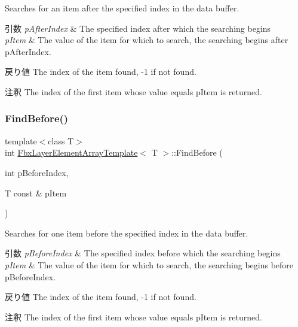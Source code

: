 Searches for an item after the specified index in the data buffer. 
\begin{DoxyParams}{引数}
{\em p\+After\+Index} & The specified index after which the searching begins \\
\hline
{\em p\+Item} & The value of the item for which to search, the searching begins after p\+After\+Index. \\
\hline
\end{DoxyParams}
\begin{DoxyReturn}{戻り値}
The index of the item found, -\/1 if not found. 
\end{DoxyReturn}
\begin{DoxyRemark}{注釈}
The index of the first item whose value equals p\+Item is returned. 
\end{DoxyRemark}
\mbox{\label{class_fbx_layer_element_array_template_a27a66a52ff1642fd6a5ed7c34d72c3c7}} 
\subsubsection{\texorpdfstring{Find\+Before()}{FindBefore()}}
{\footnotesize\ttfamily template$<$class T$>$ \\
int \hyperlink{class_fbx_layer_element_array_template}{Fbx\+Layer\+Element\+Array\+Template}$<$ T $>$\+::Find\+Before (\begin{DoxyParamCaption}\item[{int}]{p\+Before\+Index,  }\item[{T const \&}]{p\+Item }\end{DoxyParamCaption})}

Searches for one item before the specified index in the data buffer. 
\begin{DoxyParams}{引数}
{\em p\+Before\+Index} & The specified index before which the searching begins \\
\hline
{\em p\+Item} & The value of the item for which to search, the searching begins before p\+Before\+Index. \\
\hline
\end{DoxyParams}
\begin{DoxyReturn}{戻り値}
The index of the item found, -\/1 if not found. 
\end{DoxyReturn}
\begin{DoxyRemark}{注釈}
The index of the first item whose value equals p\+Item is returned. 
\end{DoxyRemark}
\mbox{\label{class_fbx_layer_element_array_template_a68180d4ec375c231a49ce117503a1aa8}} 
